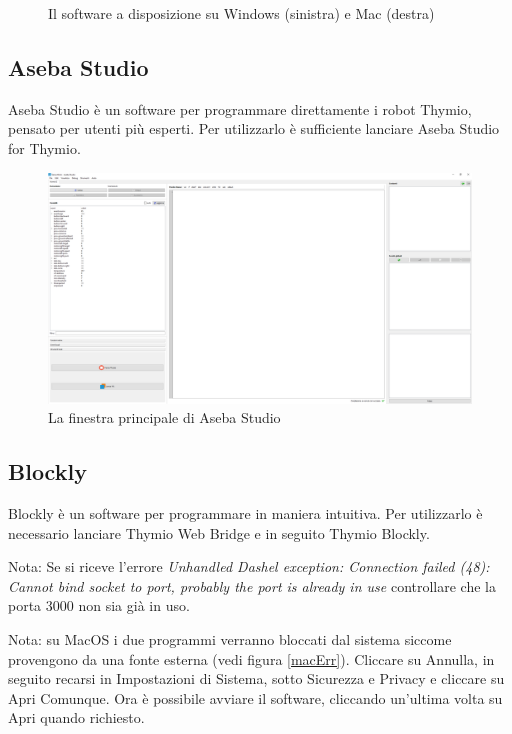 \documentclass[12pt]{article}
\begin{document}
\begin{figure}[h]
\begin{minipage}{0.49\textwidth}
		\end{minipage}
		\caption{Il software a disposizione su Windows (sinistra) e Mac (destra)}
		\label{apps}
	\end{figure}
		
	\subsection{Aseba Studio}
	
		Aseba Studio è un software per programmare direttamente i robot Thymio, pensato per utenti più esperti. Per utilizzarlo è sufficiente lanciare Aseba Studio for Thymio.
		
		\begin{figure}[H]
			\includegraphics[width=\textwidth]{img/asebaConnIta.png}
			\caption{La finestra principale di Aseba Studio}
			\label{aseba1}
		\end{figure}		

	\subsection{Blockly}

		Blockly è un software per programmare in maniera intuitiva. Per utilizzarlo è necessario lanciare Thymio Web Bridge e in seguito Thymio Blockly.
		
		Nota: Se si riceve l'errore \textit{Unhandled Dashel exception: Connection failed (48): Cannot bind socket to port, probably the port is already in use} controllare che la porta 3000 non sia già in uso.
	
		Nota: su MacOS i due programmi verranno bloccati dal sistema siccome provengono da una fonte esterna (vedi figura \ref{macErr}). Cliccare su Annulla, in seguito recarsi in Impostazioni di Sistema, sotto Sicurezza e Privacy e cliccare su Apri Comunque. Ora è possibile avviare il software, cliccando un'ultima volta su Apri quando richiesto.
		
\end{document}
